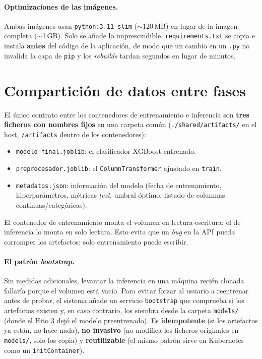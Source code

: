 \documentclass[12pt,a4paper]{report}
\begin{document}
\paragraph{Optimizaciones de las imágenes.} Ambas imágenes usan \texttt{python:3.11-slim} ($\sim$120\,MB) en lugar de la imagen completa ($\sim$1\,GB). Solo se añade lo imprescindible. \texttt{requirements.txt} se copia e instala \textbf{antes} del código de la aplicación, de modo que un cambio en un \texttt{.py} no invalida la capa de \texttt{pip} y los \textit{rebuilds} tardan segundos en lugar de minutos.

\section{Compartición de datos entre fases}
\label{sec:hito4-comparticion}

El único contrato entre los contenedores de entrenamiento e inferencia son \textbf{tres ficheros con nombres fijos} en una carpeta común (\texttt{./shared/artifacts/} en el host, \texttt{/artifacts} dentro de los contenedores):

\begin{itemize}
    \item \texttt{modelo\_final.joblib}: el clasificador XGBoost entrenado.
    \item \texttt{preprocesador.joblib}: el \texttt{ColumnTransformer} ajustado en \texttt{train}.
    \item \texttt{metadatos.json}: información del modelo (fecha de entrenamiento, hiperparámetros, métricas \textit{test}, umbral óptimo, listado de columnas continuas/categóricas).
\end{itemize}

El contenedor de entrenamiento monta el volumen en lectura-escritura; el de inferencia lo monta en solo lectura. Esto evita que un \textit{bug} en la API pueda corromper los artefactos: solo entrenamiento puede escribir.

\paragraph{El patrón \textit{bootstrap}.} Sin medidas adicionales, levantar la inferencia en una máquina recién clonada fallaría porque el volumen está vacío. Para evitar forzar al usuario a reentrenar antes de probar, el sistema añade un servicio \texttt{bootstrap} que comprueba si los artefactos existen y, en caso contrario, los siembra desde la carpeta \texttt{models/} (donde el Hito 3 dejó el modelo preentrenado). Es \textbf{idempotente} (si los artefactos ya están, no hace nada), \textbf{no invasivo} (no modifica los ficheros originales en \texttt{models/}, solo los copia) y \textbf{reutilizable} (el mismo patrón sirve en Kubernetes como un \texttt{initContainer}).
\end{document}
